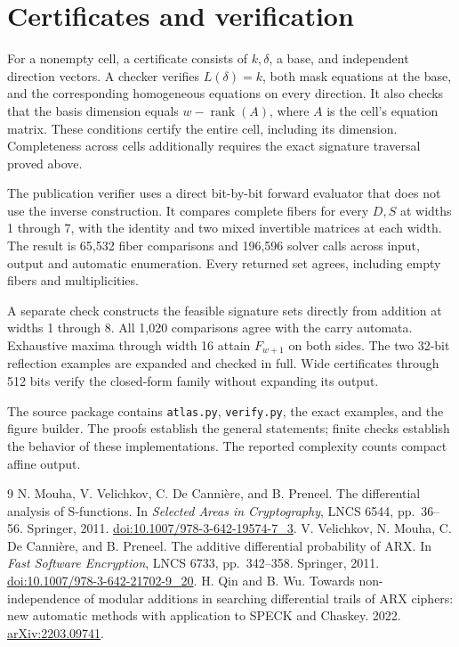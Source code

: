 \documentclass[11pt,a4paper]{article}
\theoremstyle{definition}\newtheorem{definition}[theorem]{Definition}
\DeclareMathOperator{\rank}{rank}
\begin{document}
\section{Certificates and verification}
For a nonempty cell, a certificate consists of $k,\delta$, a base, and
independent direction vectors. A checker verifies $L(\delta)=k$, both
mask equations at the base, and the corresponding homogeneous equations
on every direction. It also checks that the basis dimension equals
$w-\rank(A)$, where $A$ is the cell's equation matrix. These conditions
certify the entire cell, including its dimension. Completeness across
cells additionally requires the exact signature traversal proved above.

The publication verifier uses a direct bit-by-bit forward evaluator that
does not use the inverse construction. It compares complete fibers for
every $D,S$ at widths 1 through 7, with the identity and two mixed
invertible matrices at each width. The result is 65,532 fiber comparisons
and 196,596 solver calls across input, output and automatic enumeration.
Every returned set agrees, including empty fibers and multiplicities.

A separate check constructs the feasible signature sets directly from
addition at widths 1 through 8. All 1,020 comparisons agree with the
carry automata. Exhaustive maxima through width 16 attain $F_{w+1}$
on both sides. The two 32-bit reflection examples are expanded and
checked in full. Wide certificates through 512 bits verify the
closed-form family without expanding its output.

The source package contains \texttt{atlas.py}, \texttt{verify.py}, the
exact examples, and the figure builder. The proofs establish the general
statements; finite checks establish the behavior of these implementations.
The reported complexity counts compact affine output.

\begin{thebibliography}{9}
N. Mouha, V. Velichkov, C. De Canni\`ere, and B. Preneel.
The differential analysis of S-functions.
In \emph{Selected Areas in Cryptography}, LNCS 6544, pp.~36--56.
Springer, 2011. \href{https://doi.org/10.1007/978-3-642-19574-7_3}{doi:10.1007/978-3-642-19574-7\_3}.
V. Velichkov, N. Mouha, C. De Canni\`ere, and B. Preneel.
The additive differential probability of ARX.
In \emph{Fast Software Encryption}, LNCS 6733, pp.~342--358.
Springer, 2011. \href{https://doi.org/10.1007/978-3-642-21702-9_20}{doi:10.1007/978-3-642-21702-9\_20}.
H. Qin and B. Wu.
Towards non-independence of modular additions in searching differential
trails of ARX ciphers: new automatic methods with application to SPECK
and Chaskey. 2022. \href{https://arxiv.org/abs/2203.09741}{arXiv:2203.09741}.
\end{thebibliography}
\end{document}
